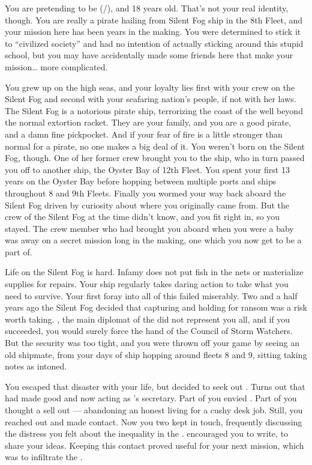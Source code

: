 \documentclass[char]{GL2020}
\begin{document}
\name{\cPirateChild{}}

You are pretending to be \cPirateChild{\full} (\cPirateChild{\they}/\cPirateChild{\them}), and 18 years old. That's not your real identity, though. You are really a \pShippie{} pirate hailing from Silent Fog ship in the 8th Fleet, and your mission here has been years in the making. You were determined to stick it to ``civilized society'' and had no intention of actually sticking around this stupid school, but you may have accidentally made some friends here that make your mission\ldots{} more complicated.

You grew up on the high seas, and your loyalty lies first with your crew on the Silent Fog and second with your seafaring nation's people, if not with her laws. The Silent Fog is a notorious pirate ship, terrorizing the coast of the \pFarm{} well beyond the normal extortion racket. They are your family, and you are a good pirate, and a damn fine pickpocket. And if your fear of fire is a little stronger than normal for a pirate, no one makes a big deal of it. You weren't born on the Silent Fog, though. One of her former crew brought you to the ship, who in turn passed you off to another ship, the Oyster Bay of 12th Fleet. You spent your first 13 years on the Oyster Bay before hopping between multiple ports and ships throughout 8 and 9th Fleets. Finally you wormed your way back aboard the Silent Fog driven by curiosity about where you originally came from. But the crew of the Silent Fog at the time didn't know, and you fit right in, so you stayed. The crew member who had brought you aboard when you were a baby was away on a secret mission long in the making, one which you now get to be a part of.

Life on the Silent Fog is hard. Infamy does not put fish in the nets or materialize supplies for repairs. Your ship regularly takes daring action to take what you need to survive. Your first foray into all of this failed miserably. Two and a half years ago the Silent Fog decided that capturing and holding \cHeadDiplomat{\full} for ransom was a risk worth taking. \cHeadDiplomat{}, the main diplomat of the \pShippies{} did not represent you all, and if you succeeded, you would surely force the hand of the Council of Storm Watchers. But the security was too tight, and you were thrown off your game by seeing an old shipmate, from your days of ship hopping around fleets 8 and 9, sitting taking notes as \cHeadDiplomat{} intoned. 

You escaped that disaster with your life, but decided to seek out \cChupLeader{\full}. Turns out that \cChupLeader{\they} had made good and now \cChupLeader{\were} acting as \cHeadDiplomat{}’s secretary. Part of you envied \cChupLeader{\them}. Part of you thought \cChupLeader{\them} a sell out — abandoning an honest living for a cushy desk job. Still, you reached out and made contact. Now you two kept in touch, frequently discussing the distress you felt about the inequality in the \pShip{}. \cChupLeader{} encouraged you to write, to share your ideas. Keeping this contact proved useful for your next mission, which was to infiltrate the \pSchool{}. 
\end{document}
